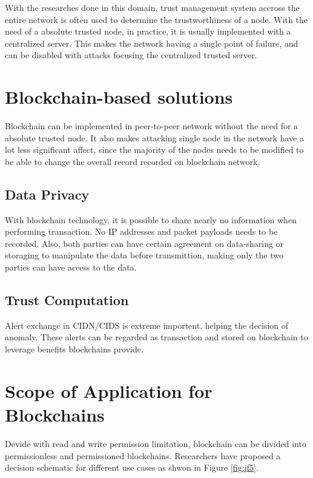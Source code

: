 \documentclass[12pt]{report}
\begin{document}
With the researches done in this domain, trust management system accross the entire network is often used to determine the trustworthiness of a node. With the need of a absolute trusted node, in practice, it is usually implemented with a centralized server. This makes the network having a single point of failure, and can be disabled with attacks focusing the centralized trusted server.

\section{Blockchain-based solutions}

Blockchain can be implemented in peer-to-peer network without the need for a absolute trusted node. It also makes attacking single node in the network have a lot less significant affect, since the majority of the nodes needs to be modified to be able to change the overall record recorded on blockchain network.

\subsection{Data Privacy}

With blockchain technology, it is possible to share nearly no information when performing transaction. No IP addresses and packet payloads needs to be recorded. Also, both parties can have certain agreement on data-sharing or storaging to manipulate the data before transmittion, making only the two parties can have access to the data.

\subsection{Trust Computation}

Alert exchange in CIDN/CIDS is extreme importent, helping the decision of anomaly. These alerts can be regarded as transaction and stored on blockchain to leverage benefits blockchains provide.

\section{Scope of Application for Blockchains}

Devide with read and write permission limitation, blockchain can be divided into permissionless and permissioned blockchains. Researchers have proposed a decision schematic \cite{8525392} for different use cases as shwon in Figure \ref{fig:jf5}.
\end{document}
